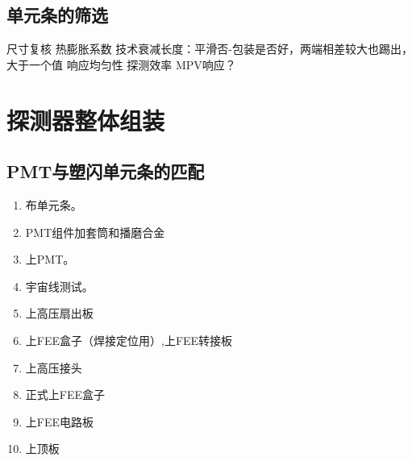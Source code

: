 \subsection{单元条的筛选}
\label{sec:construction:bar_selection}
尺寸复核
热膨胀系数
技术衰减长度：平滑否-包装是否好，两端相差较大也踢出，大于一个值
响应均匀性
探测效率
MPV响应？

\section{探测器整体组装}
\label{sec:construction:psd_assembly}

\subsection{PMT与塑闪单元条的匹配}

\begin{enumerate}
	\item 布单元条。
	\item PMT组件加套筒和播磨合金
	\item 上PMT。
	\item 宇宙线测试。
	\item 上高压扇出板
	\item 上FEE盒子（焊接定位用）,上FEE转接板
	\item 上高压接头
	\item 正式上FEE盒子
	\item 上FEE电路板
	\item 上顶板
\end{enumerate}
